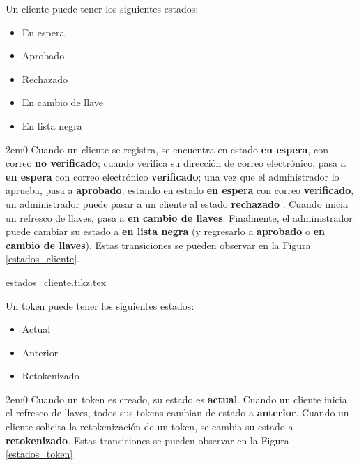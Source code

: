 {
  Un cliente puede tener los siguientes estados:
  \begin{itemize}
    \item En espera
    \item Aprobado
    \item Rechazado
    \item En cambio de llave
    \item En lista negra
  \end{itemize}

  \begin{hangparas}{2em}{0}
    Cuando un cliente se registra, se encuentra en estado \textbf{en espera},
    con correo \textbf{no verificado}; cuando verifica su dirección de correo
    electrónico, pasa a \textbf{en espera} con correo electrónico
    \textbf{verificado}; una vez que el administrador lo aprueba, pasa a
    \textbf{aprobado}; estando en estado \textbf{en espera} con correo
    \textbf{verificado}, un administrador puede pasar a un cliente al estado
    \textbf{rechazado} . Cuando inicia un refresco de llaves, pasa a
    \textbf{en cambio de llaves}. Finalmente, el administrador puede cambiar su
    estado a \textbf{en lista negra} (y regresarlo a \textbf{aprobado} o
    \textbf{en cambio de llaves}). Estas transiciones se pueden observar en la
    Figura \ref{estados_cliente}.
  \end{hangparas}
}

\begin{sidewaysfigure}
  \begin{center}
    {estados_cliente.tikz.tex}
    \caption{Diagrama de estados de un cliente.}
    \label{estados_cliente}
  \end{center}
\end{sidewaysfigure}

{
  Un token puede tener los siguientes estados:
  \begin{itemize}
    \item Actual
    \item Anterior
    \item Retokenizado
  \end{itemize}

  \begin{hangparas}{2em}{0}
    Cuando un token es creado, su estado es \textbf{actual}.
    Cuando un cliente inicia el refresco de llaves, todos sus tokens cambian de
    estado a \textbf{anterior}.
    Cuando un cliente solicita la retokenización de un token, se cambia su estado
    a \textbf{retokenizado}.  Estas transiciones se pueden observar en la Figura
    \ref{estados_token}
  \end{hangparas}
}

